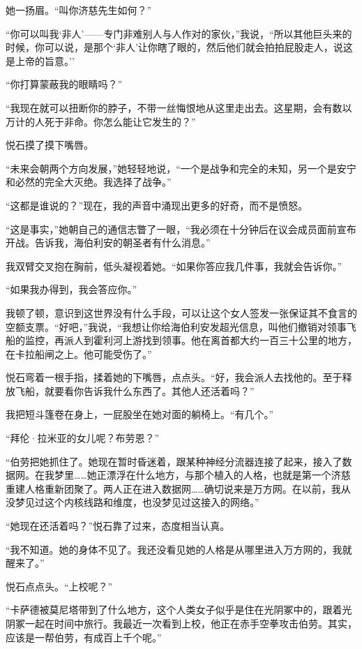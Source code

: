 \documentclass[AutoFakeBold=true]{book}
\begin{document}
她一扬眉。``叫你济慈先生如何？''

``你可以叫我`非人'——专门非难别人与人作对的家伙，''我说，``所以其他巨头来的时候，你可以说，是那个`非人'让你瞎了眼的，然后他们就会拍拍屁股走人，说这是上帝的旨意。''

``你打算蒙蔽我的眼睛吗？''

``我现在就可以扭断你的脖子，不带一丝悔恨地从这里走出去。这星期，会有数以万计的人死于非命。你怎么能让它发生的？''

悦石摸了摸下嘴唇。

``未来会朝两个方向发展，''她轻轻地说，``一个是战争和完全的未知，另一个是安宁和必然的完全大灭绝。我选择了战争。''

``这都是谁说的？''现在，我的声音中涌现出更多的好奇，而不是愤怒。

``这是事实，''她朝自己的通信志瞥了一眼，``我必须在十分钟后在议会成员面前宣布开战。告诉我，海伯利安的朝圣者有什么消息。''

我双臂交叉抱在胸前，低头凝视着她。``如果你答应我几件事，我就会告诉你。''

``如果我办得到，我会答应你。''

我顿了顿，意识到这世界没有什么手段，可以让这个女人签发一张保证其不食言的空额支票。``好吧，''我说，``我想让你给海伯利安发超光信息，叫他们撤销对领事飞船的监控，再派人到霍利河上游找到领事。他在离首都大约一百三十公里的地方，在卡拉船闸之上。他可能受伤了。''

悦石弯着一根手指，揉着她的下嘴唇，点点头。``好，我会派人去找他的。至于释放飞船，就要看你告诉我什么东西了。其他人还活着吗？''

我把短斗篷卷在身上，一屁股坐在她对面的躺椅上。``有几个。''

``拜伦·拉米亚的女儿呢？布劳恩？''

``伯劳把她抓住了。她现在暂时昏迷着，跟某种神经分流器连接了起来，接入了数据网。在我梦里……她正漂浮在什么地方，与那个植入的人格，也就是第一个济慈重建人格重新团聚了。两人正在进入数据网……确切说来是万方网。在以前，我从没梦见过这个内核线路和维度，也没梦见过这接入的网络。''

``她现在还活着吗？''悦石靠了过来，态度相当认真。

``我不知道。她的身体不见了。我还没看见她的人格是从哪里进入万方网的，我就醒来了。''

悦石点点头。``上校呢？''

``卡萨德被莫尼塔带到了什么地方，这个人类女子似乎是住在光阴冢中的，跟着光阴冢一起在时间中旅行。我最近一次看到上校，他正在赤手空拳攻击伯劳。其实，应该是一帮伯劳，有成百上千个呢。''
\end{document}

